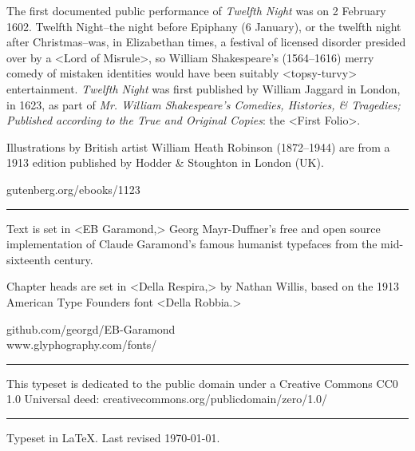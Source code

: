 \documentclass[
a5paper,
]{scrbook} %
\begin{document}
\begin{minipage}{\textwidth}
The first documented public performance of \textit{Twelfth Night} was on 2 February 1602. Twelfth Night--the night before Epiphany (6 January), or the twelfth night after Christmas--was, in Elizabethan times, a festival of licensed disorder presided over by a <Lord of Misrule>, so William Shakespeare's (1564--1616) merry comedy of mistaken identities would have been suitably <topsy-turvy> entertainment. \textit{Twelfth Night} was first published by William Jaggard in London, in 1623, as part of \textit{Mr. William Shakespeare's Comedies, Histories, \& Tragedies; Published according to the True and Original Copies}: the <First Folio>.

Illustrations by British artist William Heath Robinson (1872--1944) are from a 1913 edition published by Hodder \& Stoughton in London (UK).
\end{minipage}
\vfill
gutenberg.org/ebooks/1123
\vfill
\rule{0.5\textwidth}{.4pt}
\vfill
\begin{minipage}{\textwidth}
Text is set in <EB Garamond,> Georg Mayr-Duffner's free and open source implementation of Claude Garamond’s famous humanist typefaces from the mid-sixteenth century. 

Chapter heads are set in <Della Respira,> by Nathan Willis, based on the 1913 American Type Founders font <Della Robbia.>
\end{minipage}
\vfill
github.com/georgd/EB-Garamond\\www.glyphography.com/fonts/
\vfill
\rule{0.5\textwidth}{.4pt}
\vfill
\begin{minipage}{\textwidth}
This typeset is dedicated to the public domain under a Creative Commons CC0 1.0 Universal deed: creativecommons.org/publicdomain/zero/1.0/\\
\end{minipage}
\vfill
\rule{0.5\textwidth}{.4pt}
\vfill
Typeset in \LaTeX{}. Last revised \today.
\vfill
\thispagestyle{empty}
\end{document}
